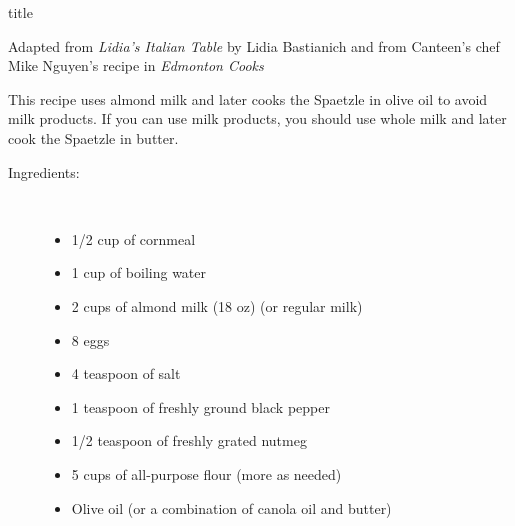 \documentclass [11pt, letterpaper] {article}
\begin{document}
 {title}

\begin {flushright}
{Adapted from {\it Lidia's Italian Table} by Lidia Bastianich and from Canteen's chef Mike Nguyen's recipe in {\it Edmonton Cooks} }
\end {flushright}

This recipe uses almond milk and later cooks the Spaetzle in olive oil to avoid milk products. If you can use milk products, you should use whole milk and later cook the Spaetzle in butter.

\vspace{0.3in}
\begin{description}

\item[Ingredients:]\ \\
	\begin{itemize}
	\item 1/2 cup of cornmeal
	\item 1 cup of boiling water
	\item 2 cups of almond milk (18 oz) (or regular milk)
	\item 8 eggs
	\item 4 teaspoon of salt
	\item 1 teaspoon of freshly ground black pepper
	\item 1/2 teaspoon of freshly grated nutmeg
	\item	5 cups of all-purpose flour (more as needed)
	\item Olive oil (or a combination of canola oil and butter)
	\end{itemize}


\end{description}
\end{document}
